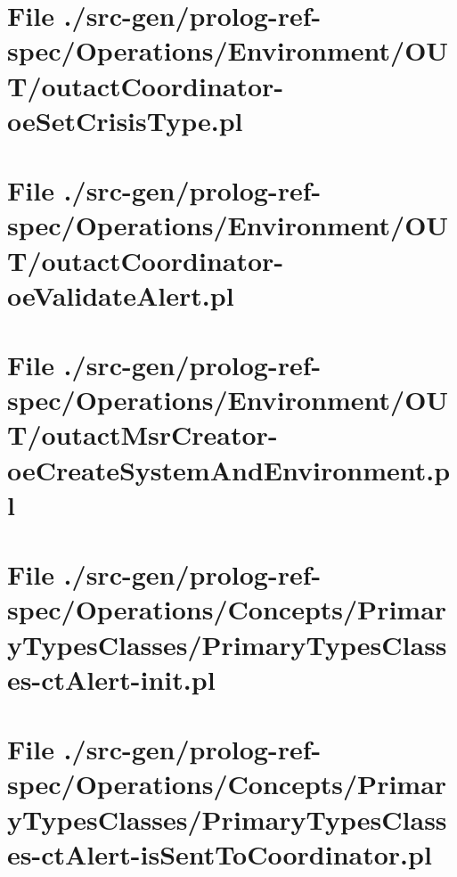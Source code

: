 \section[File /src-gen/prolog-ref-spec.../outactCoordinator-oeSetCrisisType.pl]{File ./src-gen/prolog-ref-spec/Operations/Environment/OUT/outactCoordinator-oeSetCrisisType.pl}
\scriptsize

\normalsize
	
\section[File /src-gen/prolog-ref-spec.../outactCoordinator-oeValidateAlert.pl]{File ./src-gen/prolog-ref-spec/Operations/Environment/OUT/outactCoordinator-oeValidateAlert.pl}
\scriptsize

\normalsize
	
\section[File /src-gen.../outactMsrCreator-oeCreateSystemAndEnvironment.pl]{File ./src-gen/prolog-ref-spec/Operations/Environment/OUT/outactMsrCreator-oeCreateSystemAndEnvironment.pl}
\scriptsize

\normalsize
	
\section[File /src-gen/prolog-ref-spec/Operations.../PrimaryTypesClasses-ctAlert-init.pl]{File ./src-gen/prolog-ref-spec/Operations/Concepts/PrimaryTypesClasses/PrimaryTypesClasses-ctAlert-init.pl}
\scriptsize

\normalsize
	
\section[File /src-gen.../PrimaryTypesClasses-ctAlert-isSentToCoordinator.pl]{File ./src-gen/prolog-ref-spec/Operations/Concepts/PrimaryTypesClasses/PrimaryTypesClasses-ctAlert-isSentToCoordinator.pl}
\scriptsize

\normalsize
	
